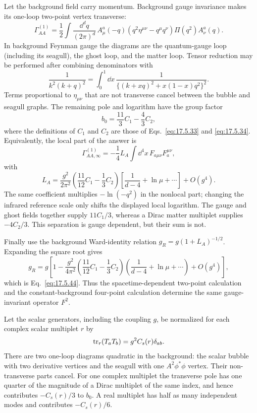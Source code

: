 \begin{enumerate}
  Let the background field carry momentum.  Background gauge invariance
  makes its one-loop two-point vertex transverse:
  \[
    \Gamma^{(1)}_{AA}
      =\frac12\int\frac{\dd^dq}{(2\pi)^d}\,
       A_\mu^a(-q)
       (q^2\eta^{\mu\nu}-q^\mu q^\nu)
       \Pi(q^2)A_\nu^a(q).
  \]
  In background Feynman gauge the diagrams are the quantum-gauge loop
  (including its seagull), the ghost loop, and the matter loop.  Tensor
  reduction may be performed after combining denominators with
  \[
    \frac1{k^2(k+q)^2}
      =\int_0^1\dd x\,
       \frac1{\{(k+xq)^2+x(1-x)q^2\}^2}.
  \]
  Terms proportional to \(\eta_{\mu\nu}\) that are not transverse cancel
  between the bubble and seagull graphs.  The remaining pole and
  logarithm have the group factor
  \[
    b_0=\frac{11}{3}C_1-\frac{4}{3}C_2 ,
  \]
  where the definitions of \(C_1\) and \(C_2\) are those of
  Eqs.~\eqref{eq:17.5.33} and \eqref{eq:17.5.34}.  Equivalently, the local
  part of the answer is
  \[
    \Gamma^{(1)}_{AA,\infty}
      =-\frac14L_A\int \dd^4x\,F_{a\mu\nu}F_a^{\mu\nu},
  \]
  with
  \[
    L_A=
      \frac{g^2}{2\pi^2}
      \left(\frac{11}{12}C_1-\frac13C_2\right)
      \left[\frac1{d-4}+\ln\mu+\cdots\right]+O(g^4).
  \]
  The same coefficient multiplies
  \(-\ln(-q^2)\) in the nonlocal part; changing the infrared reference
  scale only shifts the displayed local logarithm.  The gauge and ghost
  fields together supply \(11C_1/3\), whereas a Dirac matter multiplet
  supplies \(-4C_2/3\).  This separation is gauge dependent, but their
  sum is not.

  Finally use the background Ward-identity relation
  \(g_R=g(1+L_A)^{-1/2}\).  Expanding the square root gives
  \[
    \boxed{
    g_R=g\left[1-\frac{g^2}{4\pi^2}
      \left(\frac{11}{12}C_1-\frac13C_2\right)
      \left(\frac1{d-4}+\ln\mu+\cdots\right)
      +O(g^4)\right],}
  \]
  which is Eq.~\eqref{eq:17.5.44}.  Thus the spacetime-dependent
  two-point calculation and the constant-background four-point
  calculation determine the same gauge-invariant operator \(F^2\).

  Let the scalar generators, including the coupling \(g\), be normalized
  for each complex scalar multiplet \(r\) by
  \[
    {\rm tr}_r(T_a T_b)
       =g^2 C_s(r)\delta_{ab}.
  \]
  There are two one-loop diagrams quadratic in the background: the
  scalar bubble with two derivative vertices and the seagull with one
  \(A^2\phi^*\phi\) vertex.  Their non-transverse parts cancel.  For one
  complex multiplet the transverse pole has one quarter of the magnitude
  of a Dirac multiplet of the same index, and hence contributes
  \(-C_s(r)/3\) to \(b_0\).  A real multiplet has half as many independent
  modes and contributes \(-C_s(r)/6\).


\end{enumerate}

